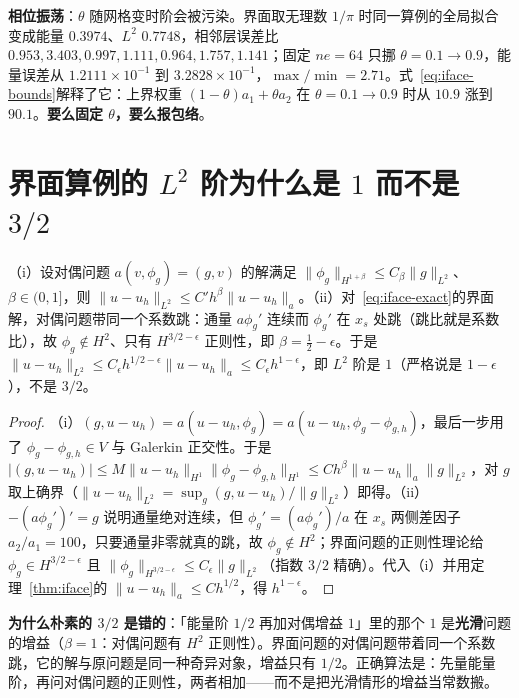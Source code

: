 \textbf{相位振荡}：$\theta$ 随网格变时阶会被污染。界面取无理数 $1/\pi$ 时同一算例的全局拟合变成能量 $0.3974$、$L^2$ $0.7748$，相邻层误差比
$0.953,3.403,0.997,1.111,0.964,1.757,1.141$；固定 $ne=64$ 只挪 $\theta=0.1\to0.9$，能量误差从
$1.2111\times10^{-1}$ 到
$3.2828\times10^{-1}$，$\max/\min=2.71$。式~\eqref{eq:iface-bounds}解释了它：上界权重 $(1-\theta)a_1+\theta
a_2$ 在 $\theta=0.1\to0.9$ 时从 $10.9$ 涨到 $90.1$。\textbf{要么固定 $\theta$，要么报包络}。

\section{界面算例的 $L^2$ 阶为什么是 $1$ 而不是 $3/2$}

\begin{theorem}
\label{thm:aubin}
（i）设对偶问题 $a(v,\phi_g)=(g,v)$ 的解满足 $\|\phi_g\|_{H^{1+\beta}}\le
C_\beta\|g\|_{L^2}$、$\beta\in(0,1]$，则 $\|u-u_h\|_{L^2}\le
C'h^{\beta}\|u-u_h\|_a$。（ii）对~\eqref{eq:iface-exact}的界面解，对偶问题带同一个系数跳：通量 $a\phi_g'$ 连续而 $\phi_g'$
在 $x_s$ 处跳（跳比就是系数比），故 $\phi_g\notin H^2$、只有 $H^{3/2-\epsilon}$ 正则性，即 $\beta=\frac12-\epsilon$。于是
$\|u-u_h\|_{L^2}\le C_\epsilon h^{1/2-\epsilon}\|u-u_h\|_a\le C_\epsilon h^{1-\epsilon}$，即 $L^2$
阶是 $1$（严格说是 $1-\epsilon$），不是 $3/2$。
\end{theorem}
\begin{proof}
（i）$(g,u-u_h)=a(u-u_h,\phi_g)=a(u-u_h,\phi_g-\phi_{g,h})$，最后一步用了 $\phi_g-\phi_{g,h}\in V$ 与
Galerkin 正交性。于是 $|(g,u-u_h)|\le M\|u-u_h\|_{H^1}\|\phi_g-\phi_{g,h}\|_{H^1}\le
Ch^{\beta}\|u-u_h\|_a\|g\|_{L^2}$，对 $g$
取上确界（$\|u-u_h\|_{L^2}=\sup_g(g,u-u_h)/\|g\|_{L^2}$）即得。（ii）$-(a\phi_g')'=g$ 说明通量绝对连续，但
$\phi_g'=(a\phi_g')/a$ 在 $x_s$ 两侧差因子 $a_2/a_1=100$，只要通量非零就真的跳，故 $\phi_g\notin H^2$；界面问题的正则性理论给
$\phi_g\in H^{3/2-\epsilon}$ 且 $\|\phi_g\|_{H^{3/2-\epsilon}}\le C_\epsilon\|g\|_{L^2}$（指数 $3/2$
精确）。代入（i）并用定理~\ref{thm:iface}的 $\|u-u_h\|_a\le Ch^{1/2}$，得 $h^{1-\epsilon}$。
\end{proof}

\textbf{为什么朴素的 $3/2$ 是错的}：「能量阶 $1/2$ 再加对偶增益 $1$」里的那个 $1$ 是\textbf{光滑}问题的增益（$\beta=1$：对偶问题有 $H^2$
正则性）。界面问题的对偶问题带着同一个系数跳，它的解与原问题是同一种奇异对象，增益只有 $1/2$。正确算法是：先量能量阶，再问对偶问题的正则性，两者相加——而不是把光滑情形的增益当常数搬。

